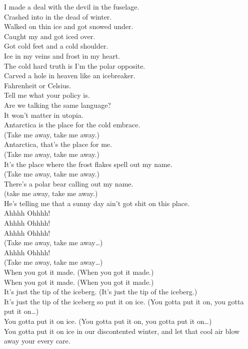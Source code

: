 I made a deal with the devil in the fuselage. \\
Crashed into  in the dead of winter. \\
Walked on thin ice and got snowed under. \\
Caught my  and got iced over. \\
Got cold feet and a cold shoulder. \\
Ice in my veins and frost in my heart. \\
The cold hard truth is I'm the polar opposite. \\
Carved a hole in heaven like an icebreaker. \\

Fahrenheit or Celsius. \\
Tell me what your policy is. \\
Are we talking the same language? \\
It won't matter in utopia. \\
Antarctica is the place for the cold embrace. \\

(Take me away, take me away.) \\
Antarctica, that's the place for me. \\
(Take me away, take me away.) \\
It's the place where the frost flakes spell out my name. \\
(Take me away, take me away.) \\
There's a polar bear calling out my name. \\
(take me away, take me away.) \\
He's telling me that a sunny day ain't got shit on this place. \\

Ahhhh Ohhhh! \\
Ahhhh Ohhhh! \\
Ahhhh Ohhhh! \\
(Take me away, take me away…) \\
Ahhhh Ohhhh! \\
(Take me away, take me away…) \\

When you got it made. (When you got it made.) \\
When you got it made. (When you got it made.) \\
It's just the tip of the iceberg. (It's just the tip of the iceberg.) \\
It's just the tip of the iceberg so put it on ice. (You gotta put it on, you gotta put it on…) \\
You gotta put it on ice. (You gotta put it on, you gotta put it on…) \\
You gotta put it on ice in our discontented winter, and let that cool air blow away your every care. \\

